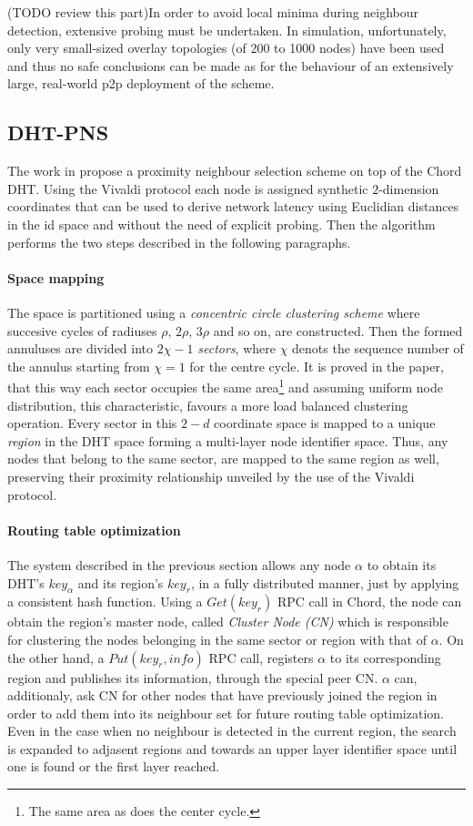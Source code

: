 \documentclass[a4paper,10pt]{article}
\begin{document}
(TODO review this part)In order to avoid local minima during neighbour detection, extensive probing must be undertaken. In simulation, unfortunately, only very small-sized overlay topologies (of 200 to 1000 nodes) have been used and thus no safe conclusions can be made as for the behaviour of an extensively large, real-world p2p deployment of the scheme. 

\subsection{DHT-PNS}
The work in \cite{hancong_pnsbased_2006} propose a proximity neighbour selection scheme on top of the Chord DHT. Using the Vivaldi protocol\cite{cox_vivaldi_2004} each node is assigned synthetic $2$-dimension coordinates that can be used to derive network latency using Euclidian distances in the id space and without the need of explicit probing. Then the algorithm performs the two steps described in the following paragraphs.
\paragraph{Space mapping} The space is partitioned using a \emph{concentric circle clustering scheme} where succesive cycles of radiuses $\rho$, $2\rho$, $3\rho$ and so on, are constructed. Then the formed annuluses are divided into $2\chi-1$ \emph{sectors}, where $\chi$ denots the sequence number of the annulus starting from $\chi = 1$ for the centre cycle. It is proved in the paper, that this way each sector occupies the same area\footnote{The same area as does the center cycle.} and assuming uniform node distribution, this characteristic, favours a more load balanced clustering operation. Every sector in this $2-d$ coordinate space is mapped to a unique \emph{region} in the DHT space forming a multi-layer node identifier space. Thus, any nodes that belong to the same sector, are mapped to the same region as well, preserving their proximity relationship unveiled by the use of the Vivaldi protocol.
\paragraph{Routing table optimization} The system described in the previous section allows any node $\alpha$ to obtain its DHT's $key_{\alpha}$ and its region's $key_r$, in a fully distributed manner, just by applying a consistent hash function. Using a $Get\left( key_r \right)$ RPC call in Chord, the node can obtain the region's master node, called \emph{Cluster Node (CN)} which is responsible for clustering the nodes belonging in the same sector or region with that of $\alpha$. On the other hand, a $Put\left( key_r, info\right)$ RPC call, registers $\alpha$ to its corresponding region and publishes its information, through the special peer CN. $\alpha$ can, additionaly, ask CN for other nodes that have previously joined the region in order to add them into its neighbour set for future routing table optimization. Even in the case when no neighbour is detected in the current region, the search is expanded to adjasent regions and towards an upper layer identifier space until one is found or the first layer reached.
\end{document}
